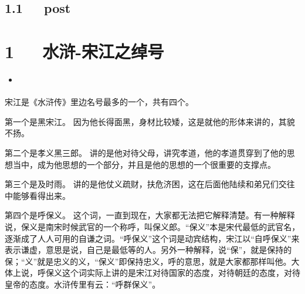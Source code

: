 \documentclass[letterpaper,12pt,english]{sphinxmanual}
\begin{document}
\section{1.1   post}
\label{\detokenize{p02_u8bfb_u4e66/Hello_uff0cp02_u8bfb_u4e66:post}}

\chapter{1   水浒-宋江之绰号}
\label{\detokenize{p02_u8bfb_u4e66/_u6c34_u6d52-_u5b8b_u6c5f_u4e4b_u7ef0_u53f7:id1}}\label{\detokenize{p02_u8bfb_u4e66/_u6c34_u6d52-_u5b8b_u6c5f_u4e4b_u7ef0_u53f7::doc}}
\begin{sphinxShadowBox}
\begin{itemize}
\item {} 
\label{\detokenize{p02_u8bfb_u4e66/_u6c34_u6d52-_u5b8b_u6c5f_u4e4b_u7ef0_u53f7:id3}}{\hyperref[\detokenize{p02_u8bfb_u4e66/_u6c34_u6d52-_u5b8b_u6c5f_u4e4b_u7ef0_u53f7:id1}]{}}

\end{itemize}
\end{sphinxShadowBox}

宋江是《水浒传》里边名号最多的一个，共有四个。

第一个是黑宋江。
因为他长得面黑，身材比较矮，这是就他的形体来讲的，其貌不扬。

第二个是孝义黑三郎。
讲的是他对待父母，讲究孝道，他的孝道贯穿到了他的思想当中，成为他思想的一个部分，并且是他的思想的一个很重要的支撑点。

第三个是及时雨。
讲的是他仗义疏财，扶危济困，这在后面他陆续和弟兄们交往中能够看得出来。

第四个是呼保义。
这个词，一直到现在，大家都无法把它解释清楚。有一种解释说，保义是南宋时候武官的一个称呼，叫保义郎。“保义”本是宋代最低的武官名，逐渐成了人人可用的自谦之词。“呼保义”这个词是动宾结构，宋江以“自呼保义”来表示谦虚，意思是说，自己是最低等的人。另外一种解释，说“保”，就是保持的保；“义”就是忠义的义，“保义”即保持忠义，呼的意思，就是大家都那样叫他。大体上说，呼保义这个词实际上讲的是宋江对待国家的态度，对待朝廷的态度，对待皇帝的态度。水浒传里有云：“呼群保义”。
\end{document}
